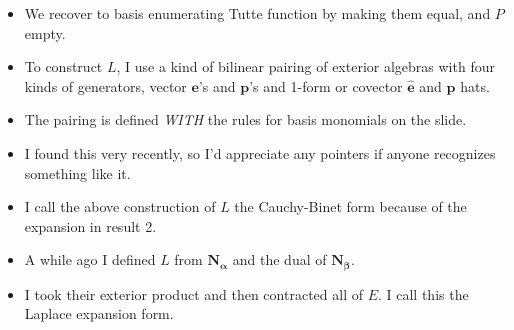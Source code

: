 \documentclass{article}
\begin{document}
\begin{itemize}
\item
We recover to basis enumerating Tutte function by making them equal, and $P$ empty.

\item
To construct $L$, I use a kind of bilinear pairing of exterior algebras with
four kinds of generators, vector $\mathbf{e}$'s and $\mathbf{p}$'s and
1-form or covector $\widehat{\mathbf{e}}$ and $\widehat{\mathbf{p}}$ hats.

\item
The pairing is defined \emph{WITH} the rules for basis monomials on the slide.

\item
I found this very recently, so I'd appreciate any pointers if anyone recognizes something
like it.

\item
I call the above construction of $L$ the Cauchy-Binet form because of the
expansion in result 2.

\item
A while ago I defined $L$ from $\mathbf{N_\alpha}$ and the dual of $\mathbf{N_\beta}$.

\item
I took their exterior product and then contracted all of $E$.  I call this the
Laplace expansion form.
\end{itemize}
\end{document}
